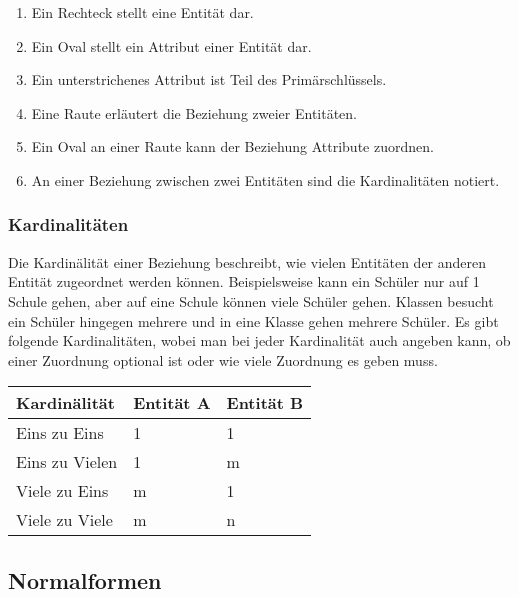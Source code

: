 \vspace*{0.3cm}

\begin{enumerate}
    \item Ein Rechteck stellt eine Entität dar.
    \item Ein Oval stellt ein Attribut einer Entität dar.
    \item Ein unterstrichenes Attribut ist Teil des Primärschlüssels.
    \item Eine Raute erläutert die Beziehung zweier Entitäten.
    \item Ein Oval an einer Raute kann der Beziehung Attribute zuordnen.
    \item An einer Beziehung zwischen zwei Entitäten sind die Kardinalitäten notiert.
\end{enumerate}

\clearpage

\subsubsection{Kardinalitäten}

Die Kardinälität einer Beziehung beschreibt, wie vielen Entitäten der anderen
Entität zugeordnet werden können. Beispielsweise kann ein Schüler nur auf 1 Schule 
gehen, aber auf eine Schule können viele Schüler gehen. Klassen besucht ein Schüler
hingegen mehrere und in eine Klasse gehen mehrere Schüler. Es gibt folgende Kardinalitäten,
wobei man bei jeder Kardinalität auch angeben kann, ob einer Zuordnung optional ist
oder wie viele Zuordnung es geben muss.

\begin{table}[H]
    \begin{tabular}{|l|l|l|}
    \hline
        Kardinälität & Entität A & Entität B \\ \hline
        Eins zu Eins & 1 & 1 \\ \hline
        Eins zu Vielen & 1 & m \\ \hline
        Viele zu Eins & m & 1 \\ \hline
        Viele zu Viele & m & n \\ \hline
        \end{tabular}
\end{table}

\subsection{Normalformen}

